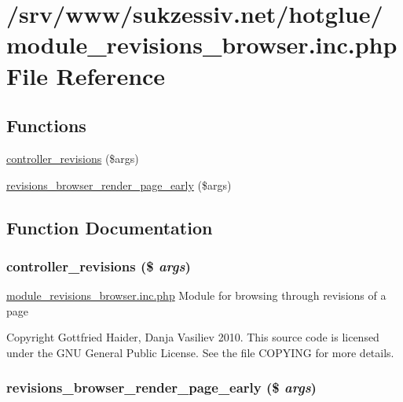 \hypertarget{module__revisions__browser_8inc_8php}{
\section{/srv/www/sukzessiv.net/hotglue/module\_\-revisions\_\-browser.inc.php File Reference}
\label{module__revisions__browser_8inc_8php}
}
\subsection*{Functions}
\begin{CompactItemize}
\item 
\hyperlink{module__revisions__browser_8inc_8php_9eda010871ad706aca87cfd7b9dd0f7d}{controller\_\-revisions} (\$args)
\item 
\hyperlink{module__revisions__browser_8inc_8php_eb482f35141c71dd933daeec9e9ce599}{revisions\_\-browser\_\-render\_\-page\_\-early} (\$args)
\end{CompactItemize}


\subsection{Function Documentation}
\hypertarget{module__revisions__browser_8inc_8php_9eda010871ad706aca87cfd7b9dd0f7d}{
\subsubsection[{controller\_\-revisions}]{\setlength{\rightskip}{0pt plus 5cm}controller\_\-revisions (\$ {\em args})}}
\label{module__revisions__browser_8inc_8php_9eda010871ad706aca87cfd7b9dd0f7d}


\hyperlink{module__revisions__browser_8inc_8php}{module\_\-revisions\_\-browser.inc.php} Module for browsing through revisions of a page

Copyright Gottfried Haider, Danja Vasiliev 2010. This source code is licensed under the GNU General Public License. See the file COPYING for more details. \hypertarget{module__revisions__browser_8inc_8php_eb482f35141c71dd933daeec9e9ce599}{
\subsubsection[{revisions\_\-browser\_\-render\_\-page\_\-early}]{\setlength{\rightskip}{0pt plus 5cm}revisions\_\-browser\_\-render\_\-page\_\-early (\$ {\em args})}}
\label{module__revisions__browser_8inc_8php_eb482f35141c71dd933daeec9e9ce599}


